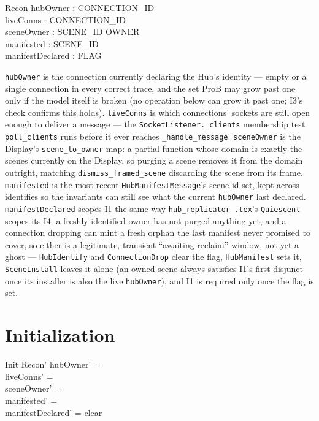 \documentclass[a4paper,10pt,fleqn]{article}
\begin{document}
\begin{schema}{Recon}
  hubOwner : \power CONNECTION\_ID \\
  liveConns : \power CONNECTION\_ID \\
  sceneOwner : SCENE\_ID \pfun OWNER \\
  manifested : \power SCENE\_ID \\
  manifestDeclared : FLAG
\end{schema}

\texttt{hubOwner} is the connection currently declaring the Hub's
identity --- empty or a single connection in every correct trace, and the
set ProB may grow past one only if the model itself is broken (no
operation below can grow it past one; I3's check confirms this holds).
\texttt{liveConns} is which connections' sockets are still open enough to
deliver a message --- the \texttt{SocketListener.\_clients} membership
test \texttt{poll\_clients} runs before it ever reaches
\texttt{\_handle\_message}.  \texttt{sceneOwner} is the Display's
\texttt{scene\_to\_owner} map: a partial function whose domain is exactly
the scenes currently on the Display, so purging a scene removes it from
the domain outright, matching \texttt{dismiss\_framed\_scene} discarding
the scene from its frame.  \texttt{manifested} is the most recent
\texttt{HubManifestMessage}'s scene-id set, kept across identifies so the
invariants can still see what the current \texttt{hubOwner} last declared.
\texttt{manifestDeclared} scopes I1 the same way \texttt{hub\_replicator
.tex}'s \texttt{Quiescent} scopes its I4: a freshly identified owner has
not purged anything yet, and a connection dropping can mint a fresh orphan
the last manifest never promised to cover, so either is a legitimate,
transient ``awaiting reclaim'' window, not yet a ghost ---
\texttt{HubIdentify} and \texttt{ConnectionDrop} clear the flag,
\texttt{HubManifest} sets it, \texttt{SceneInstall} leaves it alone (an
owned scene always satisfies I1's first disjunct once its installer is
also the live \texttt{hubOwner}), and I1 is required only once the flag is
set.

\section{Initialization}

\begin{schema}{Init}
  Recon'
\where
  hubOwner' = \emptyset \\
  liveConns' = \emptyset \\
  sceneOwner' = \emptyset \\
  manifested' = \emptyset \\
  manifestDeclared' = clear
\end{schema}
\end{document}
